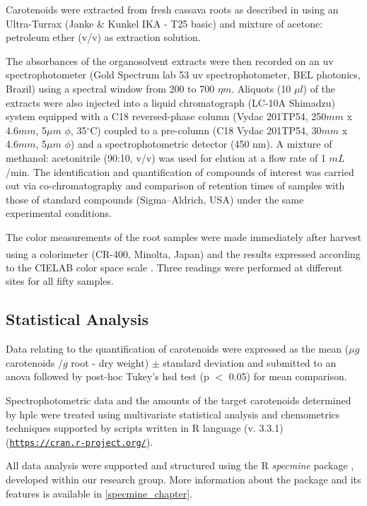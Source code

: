 Carotenoids were extracted from fresh cassava roots as described in  \cite{rodriguez2004harvestplus} using an Ultra-Turrax (Janke \& Kunkel IKA - T25 basic) and mixture of acetone: petroleum ether (v/v) as extraction solution.

The absorbances of the organosolvent extracts were then recorded on an \gls{uv} spectrophotometer (Gold Spectrum lab 53 \gls{uv} spectrophotometer, BEL photonics, Brazil) using a spectral window from 200 to 700 $\eta m$. Aliquots (10 $\mu l$) of the extracts were also injected into a liquid chromatograph (LC-10A Shimadzu) system equipped with a C18 reversed-phase column (Vydac 201TP54, 250$mm$ x 4.6$mm$, 5$\mu m$ $\phi$, 35$^{\circ}$C) coupled to a pre-column (C18 Vydac 201TP54, 30$mm$ x 4.6$mm$, 5$\mu m$ $\phi$) and a spectrophotometric detector (450 nm). A mixture of methanol: acetonitrile (90:10, v/v) was used for elution at a flow rate of 1 $mL$/min. The identification and quantification of compounds of interest was carried out via co-chromatography and comparison of retention times of samples with those of standard compounds (Sigma–Aldrich, USA) under the same experimental conditions.

The color measurements of the root samples were made immediately after harvest  using a colorimeter (CR-400, Minolta\textsuperscript{\tiny\textregistered}, Japan) and the results expressed according to the CIELAB color space scale \citep{la2013biofortified}. Three readings were performed at different sites for all fifty samples.


\subsection{Statistical Analysis} \label{stat}

Data relating to the quantification of carotenoids were expressed as the mean ($\mu g$ carotenoids $/g$ root - dry weight) $\pm$ standard deviation and submitted to an \gls{anova} followed by post-hoc Tukey's \gls{hsd} test (p $ < $ 0.05) for mean comparison.

Spectrophotometric data and the amounts of the target carotenoids determined by \gls{hplc} were treated using multivariate statistical analysis and chemometrics techniques supported by scripts written in R language (v. 3.3.1) (\href{https://cran.r-project.org/}{\nolinkurl{https://cran.r-project.org/}}).

All data analysis were supported and structured using the R \textit{specmine} package \citep{costa2016r}, developed within our research group. More information about the package and its features is available in \autoref{specmine_chapter}.


